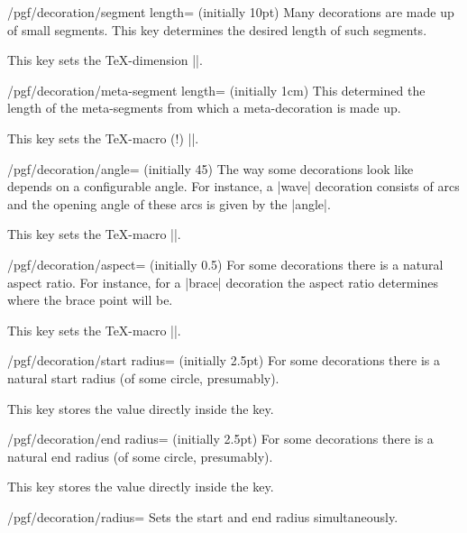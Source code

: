 \begin{key}{/pgf/decoration/segment length= (initially 10pt)}
    Many decorations are made up of small segments. This key determines the
    desired length of such segments.

    This key sets the \TeX-dimension |\pgfdecorationsegmentlength|.
\end{key}

\begin{key}{/pgf/decoration/meta-segment length= (initially 1cm)}
    This determined the length of the meta-segments from which a
    meta-decoration is made up.

    This key sets the \TeX-macro (!) |\pgfmetadecorationsegmentlength|.
\end{key}

\begin{key}{/pgf/decoration/angle= (initially 45)}
    The way some decorations look like depends on a configurable angle. For
    instance, a |wave| decoration consists of arcs and the opening angle of
    these arcs is given by the |angle|.

    This key sets the \TeX-macro |\pgfdecorationsegmentangle|.
\end{key}

\begin{key}{/pgf/decoration/aspect= (initially 0.5)}
    For some decorations there is a natural aspect ratio. For instance,
    for a |brace| decoration the aspect ratio determines where the brace
    point will be.

    This key sets the \TeX-macro |\pgfdecorationsegmentaspect|.
\end{key}

\begin{key}{/pgf/decoration/start radius= (initially 2.5pt)}
    For some decorations there is a natural start radius (of some circle,
    presumably).

    This key stores the value directly inside the key.
\end{key}

\begin{key}{/pgf/decoration/end radius= (initially 2.5pt)}
    For some decorations there is a natural end radius (of some circle,
    presumably).

    This key stores the value directly inside the key.
\end{key}

\begin{stylekey}{/pgf/decoration/radius=}
    Sets the start and end radius simultaneously.
\end{stylekey}

